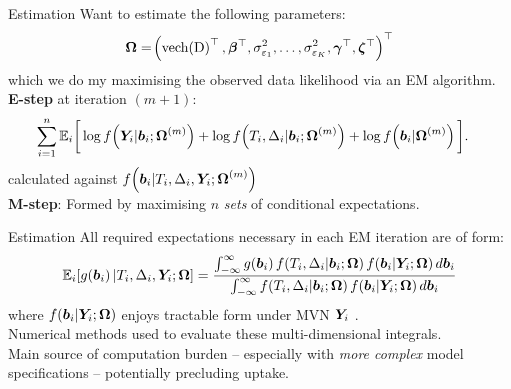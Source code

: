 \documentclass[10pt]{beamer}
\begin{document}
\begin{frame}{Estimation}
    Want to estimate the following parameters:
    \begin{align*}
    \bm{\mathrm{\Omega}}=\!\left(\text{vech}\!\left(\mathrm{D}\right)^\top,\bm{\beta}^\top,\sigma^2_{\varepsilon_1},\ldots,\sigma^2_{\varepsilon_K},\bm{\gamma}^\top,\bm{\zeta}^\top\right)^\top
    \end{align*}
    which we do my maximising the observed data likelihood via an EM algorithm.\\
    \vspace{2mm}
    \textbf{E-step} at iteration $(m+1)$:
    \begin{equation*}
    \begin{aligned}
      \sum_{i=1}^n \operatorname{\mathbb{E}}_i\!\bigg[&\log f\!\left(\bm{Y}_i|\bm{b}_i;\bm{\mathrm{\Omega}}^{(m)}\right) + \log f\!\left( T_i,\Delta_i|\bm{b}_i;\bm{\mathrm{\Omega}}^{(m)}\right)+\log f\!\left(\bm{b}_i|\bm{\mathrm{\Omega}}^{(m)}\right)\bigg].
    \end{aligned}
  \label{eq:methods-E-step}
  \end{equation*}
  calculated against $f\!\left(\bm{b}_i|T_i,\Delta_i,\bm{Y}_i;\bm{\mathrm{\Omega}}^{(m)}\right)$\\
  \vspace{2mm}
  \textbf{M-step}: Formed by maximising $n$ \textit{sets} of conditional expectations.
    
\end{frame}

\begin{frame}{Estimation}
    All required expectations necessary in each EM iteration are of form:
    \begin{align*}
        \operatorname{\mathbb{E}}_i\!\left[ g\!\left(\bm{b}_i\right)|T_i,\Delta_i,\bm{Y}_i;\bm{\mathrm{\Omega}}\right]=
        \frac{\int_{-\infty}^\infty g\!\left(\bm{b}_i\right) f\!\left( T_i,\Delta_i|\bm{b}_i;\bm{\mathrm{\Omega}}\right) f\!\left(\bm{b}_i|\bm{Y}_i;\bm{\mathrm{\Omega}}\right) d\bm{b}_i}{\int_{-\infty}^\infty f\!\left( T_i,\Delta_i|\bm{b}_i;\bm{\mathrm{\Omega}}\right) f\!\left(\bm{b}_i|\bm{Y}_i;\bm{\mathrm{\Omega}}\right) d\bm{b}_i}
    \end{align*}
    where $f\!\left(\bm{b}_i|\bm{Y}_i;\bm{\mathrm{\Omega}}\right)$ enjoys tractable form under MVN $\bm{Y}_i$ \cite{Wulfsohn97, Hickey2018}.\\
    \vspace{5mm}
    Numerical methods used to evaluate these multi-dimensional integrals.\\
    \vspace{5mm}
    Main source of computation burden -- especially with \textit{more complex} model specifications -- potentially precluding uptake.
\end{frame}
\end{document}
